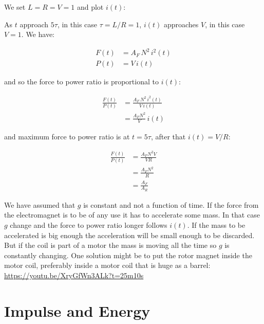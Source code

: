 \documentclass[]{../common/elementary-physics}
\begin{document}
We set $L = R = V = 1$ and plot $i(t)$:


As $t$ approach $5\tau$, in this case $\tau = L/R = 1$, $i(t)$ approaches $V$, in this case $V=1$.
We have:

\begin{subequations}
\begin{align}
F(t) &= A_F \, N^2 \, i^2(t) \\
P(t) &= V \, i(t)
\end{align}
\end{subequations}

and so the force to power ratio is proportional to $i(t)$:

\begin{subequations}
\begin{align}
\frac{F(t)}{P(t)} &= \frac{A_F \, N^2 \, i^2(t)}{V \, i(t)} \\
&= \frac{A_F N^2}{V} \, i(t)
\end{align}
\end{subequations}

and maximum force to power ratio is at $t = 5 \tau$, after that $i(t) = V/R$:

\begin{subequations}
\begin{align}
\frac{F(t)}{P(t)} &= \frac{A_F N^2 V}{V R} \\
&= \frac{A_F N^2}{R} \\
&= \frac{A_F}{A_R}
\end{align}
\end{subequations}

We have assumed that $g$ is constant and not a function of time.
If the force from the electromagnet is to be of any use it has to accelerate some mass.
In that case $g$ change and the force to power ratio longer follows $i(t)$.
If the mass to be accelerated is big enough the acceleration will be small enough to be discarded.
But if the coil is part of a motor the mass is moving all the time so $g$ is constantly changing.
One solution might be to put the rotor magnet inside the motor coil, preferably inside a motor coil that is huge as a barrel\cite{jonew}: \url{https://youtu.be/XryGfWn3ALk?t=25m10s}

\section{Impulse and Energy}
\end{document}

